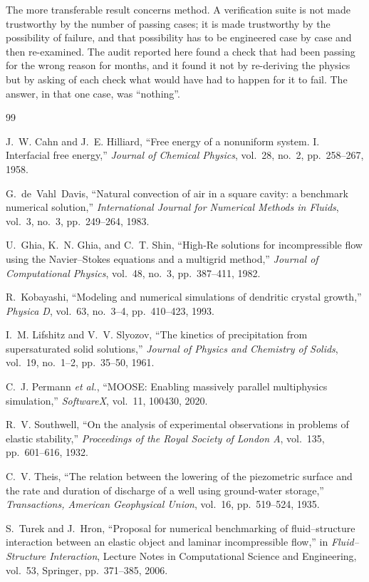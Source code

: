 \documentclass[11pt,a4paper]{article}
\begin{document}
The more transferable result concerns method. A verification suite is not made
trustworthy by the number of passing cases; it is made trustworthy by the
possibility of failure, and that possibility has to be engineered case by case
and then re-examined. The audit reported here found a check that had been passing
for the wrong reason for months, and it found it not by re-deriving the physics
but by asking of each check what would have had to happen for it to fail. The
answer, in that one case, was ``nothing''.

\begin{thebibliography}{99}\footnotesize

 J.~W. Cahn and J.~E. Hilliard,
``Free energy of a nonuniform system. I. Interfacial free energy,''
\emph{Journal of Chemical Physics}, vol.~28, no.~2, pp.~258--267, 1958.

 G.~de~Vahl~Davis,
``Natural convection of air in a square cavity: a benchmark numerical solution,''
\emph{International Journal for Numerical Methods in Fluids}, vol.~3, no.~3,
pp.~249--264, 1983.

 U.~Ghia, K.~N. Ghia, and C.~T. Shin,
``High-Re solutions for incompressible flow using the Navier--Stokes equations
and a multigrid method,'' \emph{Journal of Computational Physics}, vol.~48,
no.~3, pp.~387--411, 1982.

 R.~Kobayashi,
``Modeling and numerical simulations of dendritic crystal growth,''
\emph{Physica D}, vol.~63, no.~3--4, pp.~410--423, 1993.

 I.~M. Lifshitz and V.~V. Slyozov,
``The kinetics of precipitation from supersaturated solid solutions,''
\emph{Journal of Physics and Chemistry of Solids}, vol.~19, no.~1--2, pp.~35--50,
1961.

 C.~J. Permann \emph{et al.},
``MOOSE: Enabling massively parallel multiphysics simulation,''
\emph{SoftwareX}, vol.~11, 100430, 2020.

 R.~V. Southwell,
``On the analysis of experimental observations in problems of elastic
stability,'' \emph{Proceedings of the Royal Society of London A}, vol.~135,
pp.~601--616, 1932.

 C.~V. Theis,
``The relation between the lowering of the piezometric surface and the rate and
duration of discharge of a well using ground-water storage,''
\emph{Transactions, American Geophysical Union}, vol.~16, pp.~519--524, 1935.

 S.~Turek and J.~Hron,
``Proposal for numerical benchmarking of fluid--structure interaction between an
elastic object and laminar incompressible flow,'' in \emph{Fluid--Structure
Interaction}, Lecture Notes in Computational Science and Engineering, vol.~53,
Springer, pp.~371--385, 2006.

\end{thebibliography}
\end{document}
